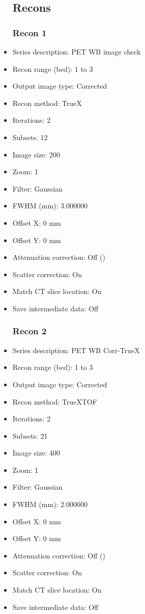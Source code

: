 \documentclass[12pt]{article}
\begin{document}
\begin{itemize}
\subsection{Recons}
\subsubsection{Recon 1}
\item Series description: PET WB image check
\item Recon range (bed): 1 to 3
\item Output image type: Corrected
\item Recon method: TrueX
\item Iterations: 2
\item Subsets: 12
\item Image size: 200
\item Zoom: 1
\item Filter: Gaussian
\item FWHM (mm): 3.000000
\item Offset X: 0 mm
\item Offset Y: 0 mm
\item Attenuation correction: Off ()
\item Scatter correction: On
\item Match CT slice location: On
\item Save intermediate data: Off
\subsubsection{Recon 2}
\item Series description: PET WB Corr-TrueX
\item Recon range (bed): 1 to 3
\item Output image type: Corrected
\item Recon method: TrueXTOF
\item Iterations: 2
\item Subsets: 21
\item Image size: 400
\item Zoom: 1
\item Filter: Gaussian
\item FWHM (mm): 2.000000
\item Offset X: 0 mm
\item Offset Y: 0 mm
\item Attenuation correction: Off ()
\item Scatter correction: On
\item Match CT slice location: On
\item Save intermediate data: Off
\end{itemize}
\end{document}
